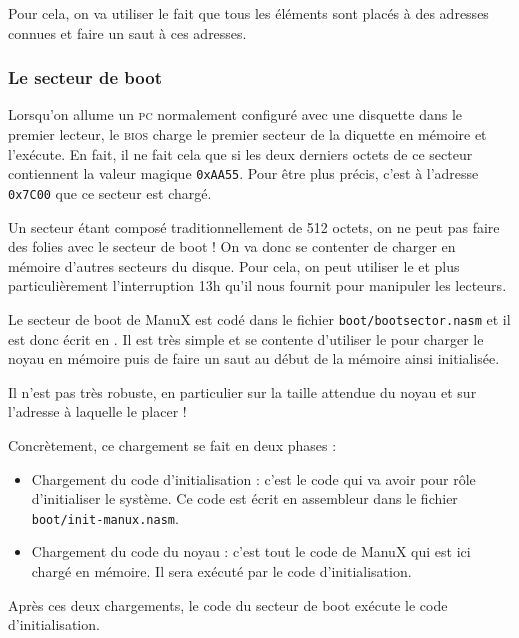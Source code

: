    Pour cela, on va utiliser le fait que tous les éléments sont
placés à des adresses connues et faire un saut à ces adresses.
   
%
\subsubsection{Le secteur de boot}

   Lorsqu'on allume un \textsc{ pc} normalement configuré avec une disquette dans
le premier lecteur, le \textsc{ bios} charge le premier secteur de la diquette en
mémoire et l'exécute. En fait, il ne fait cela que si les deux derniers octets
de ce secteur contien\-nent la valeur magique {\tt 0xAA55}. Pour être
plus précis, c'est à l'adresse {\tt 0x7C00} que ce secteur est chargé.

   Un secteur étant composé traditionnellement de 512 octets, on ne
peut pas faire des folies avec le secteur de boot ! On va donc se
contenter de charger en mémoire d'autres secteurs du disque. Pour
cela, on peut utiliser le \bios et plus particulièrement
l'interruption 13h qu'il nous fournit pour manipuler les lecteurs.

   Le secteur de boot de ManuX est codé dans le fichier
\lstinline!boot/bootsector.nasm! et il est donc écrit en \nasm. Il est
très simple et se contente d'utiliser le \bios pour charger le
noyau en mémoire puis de faire un saut au début de la mémoire ainsi
initialisée.

   Il n'est pas très robuste, en particulier sur la taille attendue du
noyau et sur l'adresse à laquelle le placer !

   Concrètement, ce chargement se fait en deux phases :

\begin{itemize}
   \item Chargement du code d'initialisation : c'est le code qui va
     avoir pour rôle d'initialiser le système. Ce code est écrit en
     assembleur dans le fichier \lstinline!boot/init-manux.nasm!.
   \item Chargement du code du noyau : c'est tout le code de ManuX qui
     est ici chargé en mémoire. Il sera exécuté par le code
     d'initialisation. 
\end{itemize}

   Après ces deux chargements, le code du secteur de boot exécute le
code d'initialisation.

